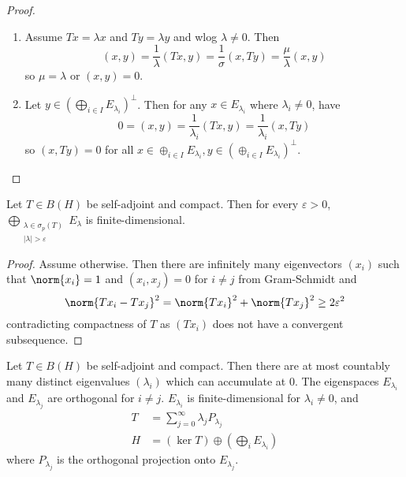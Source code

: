 \documentclass[a4paper]{article}
\begin{document}
\begin{proof}\leavevmode
  \begin{enumerate}
  \item Assume \(Tx = \lambda x\) and \(Ty = \lambda y\) and wlog \(\lambda \neq 0\). Then
    \[
      (x, y)
      = \frac{1}{\lambda} (Tx, y)
      = \frac{1}{\sigma} (x, Ty)
      = \frac{\mu}{\lambda} (x, y)
    \]
    so \(\mu = \lambda\) or \((x, y) = 0\).
  \item Let \(y \in (\bigoplus_{i \in I} E_{\lambda_i})^\perp\). Then for any \(x \in E_{\lambda_i}\) where \(\lambda_i \neq 0\), have
    \[
      0
      = (x, y)
      = \frac{1}{\lambda_i} (Tx, y)
      = \frac{1}{\lambda_i} (x, Ty)
    \]
    so \((x, Ty) = 0\) for all \(x \in \oplus_{i \in I} E_{\lambda_i}, y \in (\oplus_{i \in I} E_{\lambda_i})^\perp\).
  \end{enumerate}
\end{proof}

\begin{lemma}
  Let \(T \in B(H)\) be self-adjoint and compact. Then for every \(\varepsilon > 0\), \(\bigoplus_{\substack{\lambda \in \sigma_p(T) \\ |\lambda| > \varepsilon}} E_\lambda\) is finite-dimensional.
\end{lemma}

\begin{proof}
  Assume otherwise. Then there are infinitely many eigenvectors \((x_i)\) such that \(\norm{x_i} = 1\) and \((x_i, x_j) = 0\) for \(i \neq j\) from Gram-Schmidt and
  \[
    \norm{Tx_i - Tx_j}^2
    = \norm{Tx_i}^2 + \norm{Tx_j}^2
    \geq 2 \varepsilon^2
  \]
  contradicting compactness of \(T\) as \((Tx_i)\) does not have a convergent subsequence.
\end{proof}

\begin{theorem}
  Let \(T \in B(H)\) be self-adjoint and compact. Then there are at most countably many distinct eigenvalues \((\lambda_i)\) which can accumulate at \(0\). The eigenspaces \(E_{\lambda_i}\) and \(E_{\lambda_j}\) are orthogonal for \(i \neq j\). \(E_{\lambda_i}\) is finite-dimensional for \(\lambda_i \neq 0\), and
  \begin{align*}
    T &= \sum_{j = 0}^\infty \lambda_jP_{\lambda_j} \\
    H &= (\ker T) \oplus (\bigoplus_i E_{\lambda_i})
  \end{align*}
  where \(P_{\lambda_j}\) is the orthogonal projection onto \(E_{\lambda_j}\).
\end{theorem}
\end{document}
